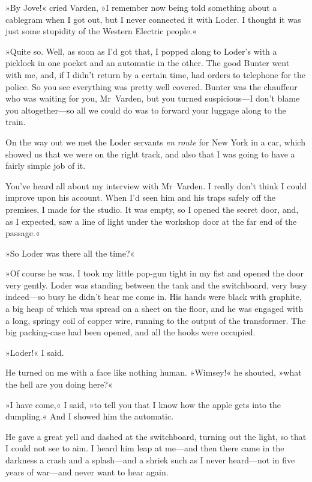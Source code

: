 »By Jove!« cried Varden, »I remember now being told something about a cablegram when I got out, but I never connected it with Loder. I thought it was just some stupidity of the Western Electric people.«

»Quite so. Well, as soon as I'd got that, I popped along to Loder's with a picklock in one pocket and an automatic in the other. The good Bunter went with me, and, if I didn't return by a certain time, had orders to telephone for the police. So you see everything was pretty well covered. Bunter was the chauffeur who was waiting for you, Mr~Varden, but you turned suspicious—I don't blame you altogether—so all we could do was to forward your luggage along to the train.

On the way out we met the Loder servants \textit{en route} for New York in a car, which showed us that we were on the right track, and also that I was going to have a fairly simple job of it.

You've heard all about my interview with Mr~Varden. I really don't think I could improve upon his account. When I'd seen him and his traps safely off the premises, I made for the studio. It was empty, so I opened the secret door, and, as I expected, saw a line of light under the workshop door at the far end of the passage.«

»So Loder was there all the time?«

»Of course he was. I took my little pop-gun tight in my fist and opened the door very gently. Loder was standing between the tank and the switchboard, very busy indeed—so busy he didn't hear me come in. His hands were black with graphite, a big heap of which was spread on a sheet on the floor, and he was engaged with a long, springy coil of copper wire, running to the output of the transformer. The big packing-case had been opened, and all the hooks were occupied.

»Loder!« I said.

He turned on me with a face like nothing human. »Wimsey!« he shouted, »what the hell are you doing here?«

»I have come,« I said, »to tell you that I know how the apple gets into the dumpling.« And I showed him the automatic.

He gave a great yell and dashed at the switchboard, turning out the light, so that I could not see to aim. I heard him leap at me—and then there came in the darkness a crash and a splash—and a shriek such as I never heard—not in five years of war—and never want to hear again.

